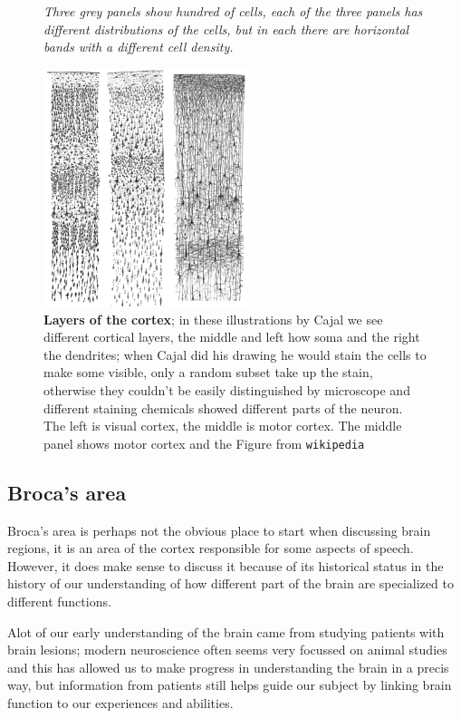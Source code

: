 \documentclass[12pt]{article}
\begin{document}
\begin{figure}[tbhp]
{\textsl{Three grey panels show hundred of cells, each of the three panels has different distributions of the cells, but in each there are horizontal bands with a different cell density.}}
{
  \begin{center}
  \includegraphics[width=6cm]{layers.png}
  \end{center}
  }
  \caption{\textbf{Layers of the cortex}; in these illustrations by
    Cajal we see different cortical layers, the middle and left how
    soma and the right the dendrites; when Cajal did his drawing he
    would stain the cells to make some visible, only a random subset
    take up the stain, otherwise they couldn't be easily distinguished
    by microscope and different staining chemicals showed different
    parts of the neuron. The left is visual cortex, the middle is
    motor cortex. The middle panel shows motor cortex and the Figure
    from \texttt{wikipedia}\label{fig_layers}}
\end{figure}




\subsection*{Broca's area}

Broca's area is perhaps not the obvious place to start when discussing
brain regions, it is an area of the cortex responsible for some
aspects of speech. However, it does make sense to discuss it because
of its historical status in the history of our understanding of how
different part of the brain are specialized to different functions.

Alot of our early understanding of the brain came from studying
patients with brain lesions; modern neuroscience often seems very
focussed on animal studies and this has allowed us to make progress in
understanding the brain in a precis way, but information from patients
still helps guide our subject by linking brain function to our
experiences and abilities.
\end{document}
